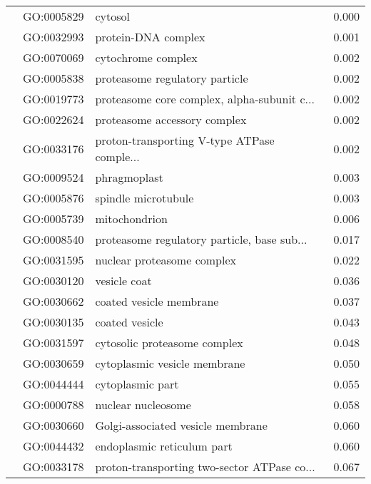 \begin{longtable}{lllr}
   & GO:0005829 &                                      cytosol &         0.000 \\
   & GO:0032993 &                          protein-DNA complex &         0.001 \\
   & GO:0070069 &                           cytochrome complex &         0.002 \\
   & GO:0005838 &               proteasome regulatory particle &         0.002 \\
   & GO:0019773 &  proteasome core complex, alpha-subunit c... &         0.002 \\
   & GO:0022624 &                 proteasome accessory complex &         0.002 \\
   & GO:0033176 &  proton-transporting V-type ATPase comple... &         0.002 \\
   & GO:0009524 &                                 phragmoplast &         0.003 \\
   & GO:0005876 &                          spindle microtubule &         0.003 \\
   & GO:0005739 &                                mitochondrion &         0.006 \\
   & GO:0008540 &  proteasome regulatory particle, base sub... &         0.017 \\
   & GO:0031595 &                   nuclear proteasome complex &         0.022 \\
   & GO:0030120 &                                 vesicle coat &         0.036 \\
   & GO:0030662 &                      coated vesicle membrane &         0.037 \\
   & GO:0030135 &                               coated vesicle &         0.043 \\
   & GO:0031597 &                 cytosolic proteasome complex &         0.048 \\
   & GO:0030659 &                 cytoplasmic vesicle membrane &         0.050 \\
   & GO:0044444 &                             cytoplasmic part &         0.055 \\
   & GO:0000788 &                           nuclear nucleosome &         0.058 \\
   & GO:0030660 &            Golgi-associated vesicle membrane &         0.060 \\
   & GO:0044432 &                   endoplasmic reticulum part &         0.060 \\
   & GO:0033178 &  proton-transporting two-sector ATPase co... &         0.067 \\

\end{longtable}
